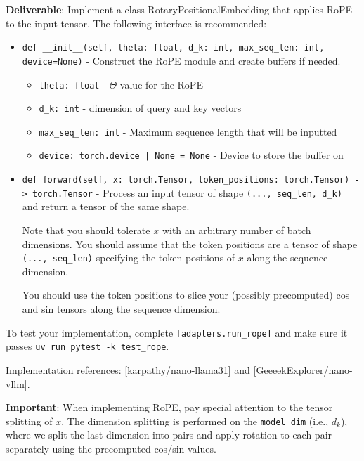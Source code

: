 
\textbf{Deliverable}: Implement a class RotaryPositionalEmbedding that applies RoPE to the input tensor. The following interface is recommended:

\begin{itemize}
    \item \lstinline{def __init__(self, theta: float, d_k: int, max_seq_len: int, device=None)} - Construct the RoPE module and create buffers if needed.
    \begin{itemize}
        \item \lstinline{theta: float} - $\Theta$ value for the RoPE
        \item \lstinline{d_k: int} - dimension of query and key vectors
        \item \lstinline{max_seq_len: int} - Maximum sequence length that will be inputted
        \item \lstinline{device: torch.device | None = None} - Device to store the buffer on
    \end{itemize}
    
    \item \lstinline{def forward(self, x: torch.Tensor, token_positions: torch.Tensor) -> torch.Tensor} - Process an input tensor of shape \lstinline{(..., seq_len, d_k)} and return a tensor of the same shape. 
    
    Note that you should tolerate $x$ with an arbitrary number of batch dimensions. You should assume that the token positions are a tensor of shape \lstinline{(..., seq_len)} specifying the token positions of $x$ along the sequence dimension.

    You should use the token positions to slice your (possibly precomputed) cos and sin tensors along the sequence dimension.
\end{itemize}

To test your implementation, complete \texttt{[adapters.run\_rope]} and make sure it passes \texttt{uv run pytest -k test\_rope}.

\begin{answer}
Implementation references: \href{https://github.com/karpathy/nano-llama31/blob/master/llama31.py}{[karpathy/nano-llama31]} and \href{https://github.com/GeeeekExplorer/nano-vllm/blob/main/nanovllm/layers/rotary_embedding.py}{[GeeeekExplorer/nano-vllm]}.

\textbf{Important}: When implementing RoPE, pay special attention to the tensor splitting of $x$. The dimension splitting is performed on the \lstinline{model_dim} (i.e., $d_k$), where we split the last dimension into pairs and apply rotation to each pair separately using the precomputed cos/sin values. 
\end{answer}

